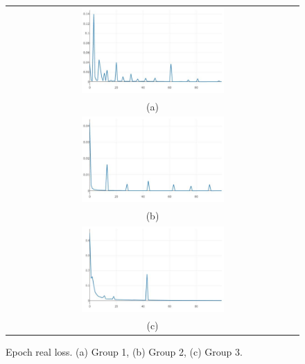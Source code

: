 \documentclass[10pt,twocolumn,letterpaper]{article}
\begin{document}
\begin{figure}%
\centering\begin{tabular}{c}
\includegraphics[width=0.5\textwidth]{fig17-a}\\
(a)\\[3ex]%
\includegraphics[width=0.5\textwidth]{fig17-b}\\
(b)\\[3ex]
\includegraphics[width=0.5\textwidth]{fig17-c}\\
(c)
\end{tabular}
\caption{Epoch real loss. (a) Group 1, (b) Group 2, (c) Group 3.}%
\label{fig17}%
\end{figure}
\end{document}
